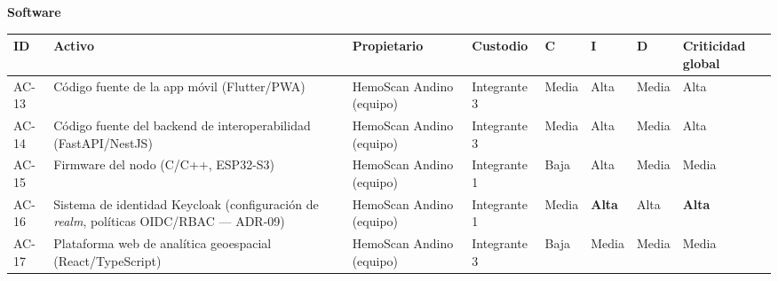 \documentclass[11pt,a4paper]{article}
\begin{document}
\textbf{Software}

{\small
\begin{longtable}[]{@{}
  >{\raggedright\arraybackslash}p{}
  >{\raggedright\arraybackslash}p{}
  >{\raggedright\arraybackslash}p{}
  >{\raggedright\arraybackslash}p{}
  >{\raggedright\arraybackslash}p{}
  >{\raggedright\arraybackslash}p{}
  >{\raggedright\arraybackslash}p{}
  >{\raggedright\arraybackslash}p{}@{}}
\toprule\noalign{}
\begin{minipage}[b]{\linewidth}\raggedright
ID
\end{minipage} & \begin{minipage}[b]{\linewidth}\raggedright
Activo
\end{minipage} & \begin{minipage}[b]{\linewidth}\raggedright
Propietario
\end{minipage} & \begin{minipage}[b]{\linewidth}\raggedright
Custodio
\end{minipage} & \begin{minipage}[b]{\linewidth}\raggedright
C
\end{minipage} & \begin{minipage}[b]{\linewidth}\raggedright
I
\end{minipage} & \begin{minipage}[b]{\linewidth}\raggedright
D
\end{minipage} & \begin{minipage}[b]{\linewidth}\raggedright
Criticidad global
\end{minipage} \\
\midrule\noalign{}
\endhead
\bottomrule\noalign{}
\endlastfoot
AC-13 & Código fuente de la app móvil (Flutter/PWA) & HemoScan Andino (equipo) & Integrante 3 & Media & Alta & Media & Alta \\
AC-14 & Código fuente del backend de interoperabilidad (FastAPI/NestJS) & HemoScan Andino (equipo) & Integrante 3 & Media & Alta & Media & Alta \\
AC-15 & Firmware del nodo (C/C++, ESP32-S3) & HemoScan Andino (equipo) & Integrante 1 & Baja & Alta & Media & Media \\
AC-16 & Sistema de identidad Keycloak (configuración de \emph{realm}, políticas OIDC/RBAC --- ADR-09) & HemoScan Andino (equipo) & Integrante 1 & Media & \textbf{Alta} & Alta & \textbf{Alta} \\
AC-17 & Plataforma web de analítica geoespacial (React/TypeScript) & HemoScan Andino (equipo) & Integrante 3 & Baja & Media & Media & Media \\
\end{longtable}
}
\end{document}

